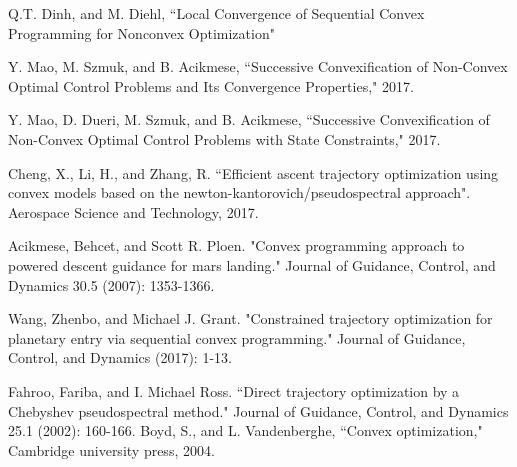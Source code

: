 \documentclass[10pt,a4paper]{article}
\begin{document}
	
	\begin{thebibliography}{1}
		
		Q.T. Dinh, and M. Diehl, ``Local Convergence of Sequential Convex Programming for Nonconvex Optimization"
		
		Y. Mao, M. Szmuk, and B. Acikmese, ``Successive Convexification of Non-Convex Optimal Control Problems and Its Convergence Properties," 2017.
		
		Y. Mao, D. Dueri, M. Szmuk, and B. Acikmese, ``Successive Convexification of Non-Convex Optimal Control Problems with State Constraints," 2017.
		
		Cheng, X., Li, H., and Zhang, R. ``Efficient ascent trajectory optimization using convex models based on the newton-kantorovich/pseudospectral approach". Aerospace Science and Technology, 2017.
		
		Acikmese, Behcet, and Scott R. Ploen. "Convex programming approach to powered descent guidance for mars landing." Journal of Guidance, Control, and Dynamics 30.5 (2007): 1353-1366.
				
		Wang, Zhenbo, and Michael J. Grant. "Constrained trajectory optimization for planetary entry via sequential convex programming." Journal of Guidance, Control, and Dynamics (2017): 1-13.
		
%		
%		
%		
				Fahroo, Fariba, and I. Michael Ross. ``Direct trajectory optimization by a Chebyshev pseudospectral method." Journal of Guidance, Control, and Dynamics 25.1 (2002): 160-166.
		Boyd, S., and L. Vandenberghe, ``Convex optimization," Cambridge university press, 2004.
		

\end{thebibliography}
\end{document}
